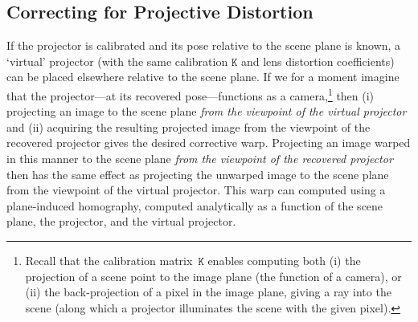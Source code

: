 \documentclass[review]{elsarticle}
\begin{document}
\subsection{Correcting for Projective Distortion}\label{sec:approach:homography}

If the projector is calibrated and its pose relative to the scene plane is known, a `virtual' projector (with the same calibration $\mathtt{K}$ and lens distortion coefficients) can be placed elsewhere relative to the scene plane. If we for a moment imagine that the projector---at its recovered pose---functions as a camera,\footnote{Recall that the calibration matrix~$\mathtt{K}$ enables computing both (i) the projection of a scene point to the image plane (the function of a camera), or (ii) the back-projection of a pixel in the image plane, giving a ray into the scene (along which a projector illuminates the scene with the given pixel).} then (i) projecting an image to the scene plane \textit{from the viewpoint of the virtual projector} and (ii) acquiring the resulting projected image from the viewpoint of the recovered projector gives the desired corrective warp. Projecting an image warped in this manner to the scene plane \textit{from the viewpoint of the recovered projector} then has the same effect as projecting the unwarped image to the scene plane from the viewpoint of the virtual projector. This warp can computed using a plane-induced homography, computed analytically as a function of the scene plane, the projector, and the virtual projector.
\end{document}

